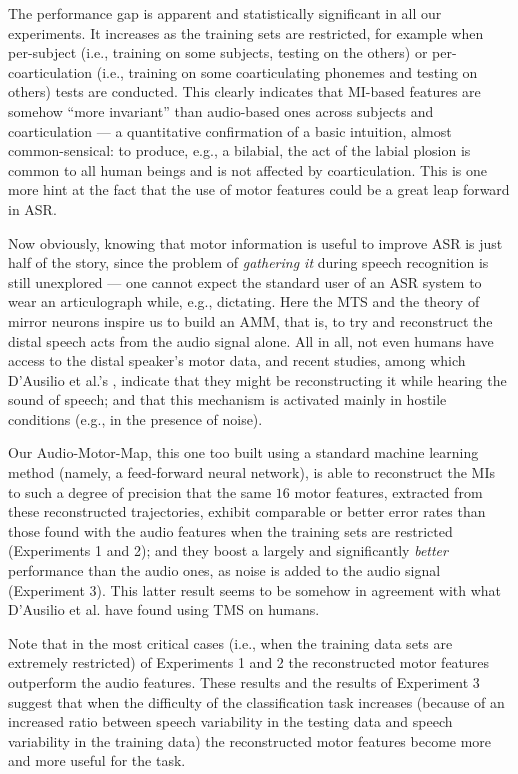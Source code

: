 \documentclass[10pt]{article}
\begin{document}
The performance gap is apparent and statistically significant in all our experiments.
It increases as the training sets are restricted, for example
when per-subject (i.e., training on some subjects, testing on the others) or
per-coarticulation (i.e., training on some coarticulating phonemes and testing on
others) tests are conducted. This clearly indicates that MI-based features are
somehow ``more invariant'' than audio-based ones across subjects and
coarticulation --- a quantitative confirmation of a basic
intuition, almost common-sensical: to produce, e.g., a bilabial, the act of
the labial plosion is common to all human beings and is not affected by
coarticulation. This is one more hint at the fact that the use of motor features
could be a great leap forward in ASR.

Now obviously, knowing that motor information is useful to improve ASR is just half
of the story, since the problem of \emph{gathering it} during speech recognition is
still unexplored --- one cannot expect the standard user of an ASR system to wear
an articulograph while, e.g., dictating. Here the MTS and the theory of mirror neurons
inspire us to build an AMM, that is, to try and reconstruct the distal speech acts from
the audio signal alone. All in all, not even humans have access to the distal speaker's
motor data, and recent studies, among which D'Ausilio et al.'s \cite{dausilio}, indicate
that they might be reconstructing it while hearing the sound of speech; and that this
mechanism is activated mainly in hostile conditions (e.g., in the presence of noise).

Our Audio-Motor-Map, this one too built using a standard machine learning
method (namely, a feed-forward neural network), is able to reconstruct the MIs
to such a degree of precision that the same $16$ motor features, extracted from these
reconstructed trajectories, exhibit comparable or better error rates than  
those found with the audio features when the training sets are restricted (Experiments 1 and 2);
 and they boost a largely and significantly \emph{better} performance than the audio ones, as
noise is added to the audio signal (Experiment 3). This latter result seems to be
somehow in agreement with what D'Ausilio et al. have found using TMS on humans.

Note that in the most critical cases (i.e., when the training data sets are extremely restricted) of Experiments 1 and 2
the reconstructed motor features outperform the audio features. These results and the results of Experiment 3
suggest that when the difficulty of the classification task increases (because of an increased ratio between speech variability 
in the testing data and speech variability in the training data) the reconstructed 
motor features become more and more useful for the task.
\end{document}
